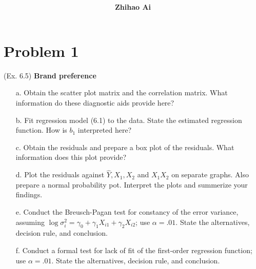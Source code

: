 \documentclass[10pt]{report}
\title{
	\vspace{2in}
	\textmd{\textbf{\hwCourse\\\hwTitle}}\\
	\vspace{0.3in}\large{\textit{\hmClassInstructor}}
	\vspace{3in}
}
\author{\textbf{Zhihao Ai}}
\date{}
\begin{document}
\maketitle

\section*{Problem 1}
(Ex. 6.5) \textbf{Brand preference}
\begin{enumerate}
	\item [a.]
	Obtain the scatter plot matrix and the correlation matrix. What information do these diagnostic aids provide here?
	
	\item [b.]
	Fit regression model (6.1) to the data. State the estimated regression function. How is $b_1$ interpreted here?
	
	\item [c.]
	Obtain the residuals and prepare a box plot of the residuals. What information does this plot provide?
	
	\item [d.]
	Plot the residuals against $\hat{Y}, X_1, X_2$ and $X_1 X_2$ on separate graphs. Also prepare a normal probability pot. Interpret the plots and summerize your findings.
	
	\item [e.]
	Conduct the Breusch-Pagan test for constancy of the error variance, assuming $\log \sigma_i^2 = \gamma_0 + \gamma_1 X_{i1} + \gamma_2 X_{i2}$; use $\alpha = .01$. State the alternatives, decision rule, and conclusion.
	
	\item [f.]
	Conduct a formal test for lack of fit of the first-order regression function; use $\alpha = .01$. State the alternatives, decision rule, and conclusion.
\end{enumerate}
\end{document}

